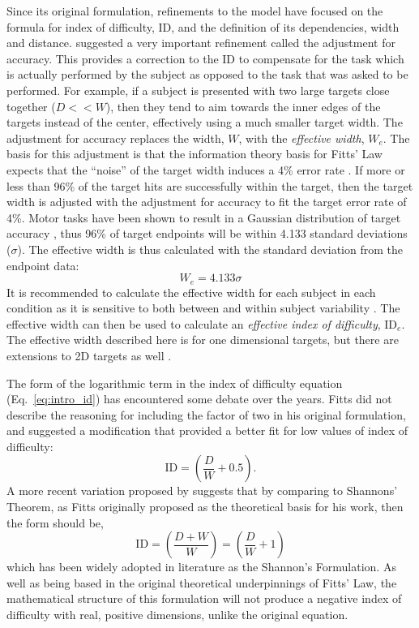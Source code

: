 Since its original formulation, refinements to the model have focused on the formula for index of difficulty, \(\text{ID}\), and the definition of its dependencies, width and distance.
\citet{crossman_speed_1957} suggested a very important refinement called the adjustment for accuracy.
This provides a correction to the \(\text{ID}\) to compensate for the task which is actually performed by the subject as opposed to the task that was asked to be performed.
For example, if a subject is presented with two large targets close together ($D << W$), then they tend to aim towards the inner edges of the targets instead of the center, effectively using a much smaller target width.
The adjustment for accuracy replaces the width, \(W\), with the \emph{effective width}, \(W_{e}\).
The basis for this adjustment is that the information theory basis for Fitts' Law expects that the ``noise'' of the target width induces a 4\% error rate \citep{mackenzie_fitts_1992}.
If more or less than 96\% of the target hits are successfully within the target, then the target width is adjusted with the adjustment for accuracy to fit the target error rate of 4\%.
Motor tasks have been shown to result in a Gaussian distribution of target accuracy \citep{crossman_feedback_1983,woodworth_accuracy_1899}, thus 96\% of target endpoints will be within 4.133 standard deviations (\(\sigma\)).
The effective width is thus calculated with the standard deviation from the endpoint data:
\begin{equation}
W_{e} = 4.133\sigma
\end{equation}
It is recommended to calculate the effective width for each subject in each condition as it is sensitive to both between and within subject variability \citep{soukoreff_towards_2004}.
The effective width can then be used to calculate an \emph{effective index of difficulty}, \(\text{ID}_{e}\).
The effective width described here is for one dimensional targets, but there are extensions to 2D targets as well \citep{murata_extending_2001}.

The form of the logarithmic term in the index of difficulty equation (Eq.\ \ref{eq:intro_id}) has encountered some debate over the years.
Fitts did not describe the reasoning for including the factor of two in his original formulation, and \citet{welford_fundamentals_1968} suggested a modification that provided a better fit for low values of index of difficulty:
\begin{equation}
    \mathrm{ID} = \left( \frac{D}{W} + 0.5 \right).
\end{equation}
A more recent variation proposed by \citet{mackenzie_note_1989} suggests that by comparing to Shannons' Theorem, as Fitts originally proposed as the theoretical basis for his work, then the form should be,
\begin{equation}
    \mathrm{ID} = \left( \frac{D + W}{W} \right) = \left( \frac{D}{W} + 1 \right)
\end{equation}
which has been widely adopted in literature as the Shannon's Formulation.
As well as being based in the original theoretical underpinnings of Fitts' Law, the mathematical structure of this formulation will not produce a negative index of difficulty with real, positive dimensions, unlike the original equation.

